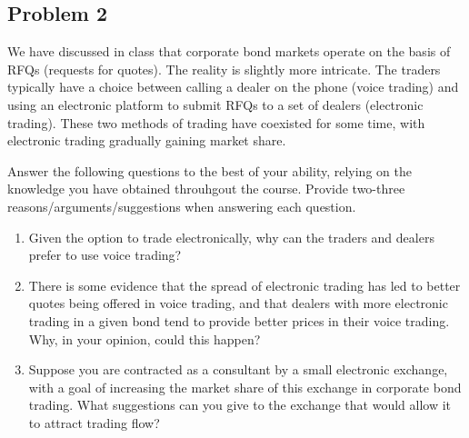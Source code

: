 \quad
\subsection*{Problem 2}
	We have discussed in class that corporate bond markets operate on the basis of RFQs (requests for quotes). The reality is slightly more intricate. The traders typically have a choice between calling a dealer on the phone (voice trading) and using an electronic platform to submit RFQs to a set of dealers (electronic trading). These two methods of trading have coexisted for some time, with electronic trading gradually gaining market share. 
	
	Answer the following questions to the best of your ability, relying on the knowledge you have obtained throuhgout the course. Provide two-three reasons/arguments/suggestions when answering each question.
	
	\begin{enumerate}
		\item 
		Given the option to trade electronically, why can the traders and dealers prefer to use voice trading?
		
		\item 
		There is some evidence that the spread of electronic trading has led to better quotes being offered in voice trading, and that dealers with more electronic trading in a given bond tend to provide better prices in their voice trading. Why, in your opinion, could this happen?
		
		\item 
		Suppose you are contracted as a consultant by a small electronic exchange, with a goal of increasing the market share of this exchange in corporate bond trading. What suggestions can you give to the exchange that would allow it to attract trading flow?
	\end{enumerate}


